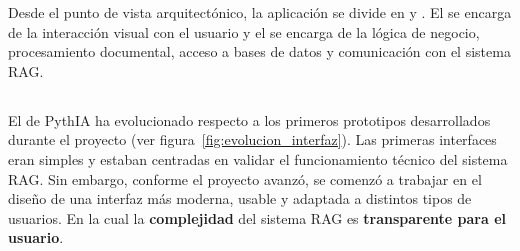 Desde el punto de vista arquitectónico, la aplicación se divide en  y . El  se encarga de la interacción visual con el usuario y el  se encarga de la lógica de negocio, procesamiento documental, acceso a bases de datos y comunicación con el sistema RAG.

\subsection{}

El  de PythIA ha evolucionado respecto a los primeros prototipos desarrollados durante el proyecto (ver figura~\ref{fig:evolucion_interfaz}). Las primeras interfaces eran simples y estaban centradas en validar el funcionamiento técnico del sistema RAG. Sin embargo, conforme el proyecto avanzó, se comenzó a trabajar en el diseño de una interfaz más moderna, usable y adaptada a distintos tipos de usuarios. En la cual la \textbf{complejidad} del sistema RAG es \textbf{transparente para el usuario}.

